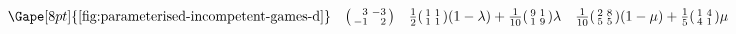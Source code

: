 \[\begin{array}{ c c c c }
    \Gape[8pt]{\text{\autoref{fig:parameterised-incompetent-games-d}}} &
        \begin{psmallmatrix*}[r] 
            3 & -3 \\
            -1 & 2 \\
        \end{psmallmatrix*} &
        \frac{1}{2}
        \begin{psmallmatrix}
            1 & 1 \\
            1 & 1 \\
        \end{psmallmatrix}
        (1 - \lambda) + \frac{1}{10}
        \begin{psmallmatrix}
            9 & 1 \\
            1 & 9 \\
        \end{psmallmatrix}
        \lambda &
        \frac{1}{10}
        \begin{psmallmatrix}
            2 & 8 \\
            5 & 5 \\
        \end{psmallmatrix}
        (1 - \mu) + \frac{1}{5}
        \begin{psmallmatrix}
            1 & 4 \\
            4 & 1 \\
        \end{psmallmatrix}
        \mu \\


\end{array}\]

